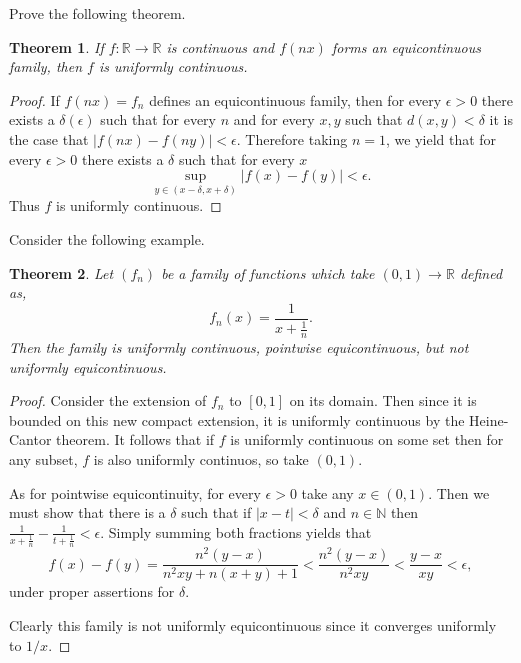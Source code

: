\documentclass[letter]{article}
\newtheorem{theorem}{Theorem}
\newenvironment{menumerate}{%
  \edef\backupindent{\the\parindent}%
  \enumerate%
  \setlength{\parindent}{\backupindent}%
}{\endenumerate}
\begin{document}
\begin{menumerate}
	\item Prove the following theorem.
	\begin{theorem}
	If $f:\mathbb{R} \to \mathbb{R}$ is continuous and $f(nx)$ forms an equicontinuous family, then
	$f$ is uniformly continuous.
	\end{theorem}
	\begin{proof}
		If $f(nx) = f_n$ defines an equicontinuous family, then for every $\epsilon > 0$ there exists
		a $\delta(\epsilon)$ such that for every $n$ and for every $x,y$ such that $d(x,y) < \delta$
		it is the case that $|f(nx) - f(ny)| < \epsilon.$ Therefore taking $n = 1$, we yield that for every
		$\epsilon > 0$ there exists a $\delta$ such that for every $x$
		$$\sup_{y\in{(x-\delta,x+\delta)}}|f(x)-f(y)| < \epsilon.$$
		Thus $f$ is uniformly continuous.
	\end{proof}
	\item Consider the following example.
	\begin{theorem}
		Let $(f_n)$ be a family of functions which take $(0,1) \to \mathbb{R}$ defined as,
		$$f_n(x) = \frac{1}{x+\frac{1}{n}}.$$
		Then the family is uniformly continuous, pointwise equicontinuous, but not uniformly equicontinuous.
	\end{theorem}
	\begin{proof}
		Consider the extension of $f_n$ to $[0,1]$ on its domain. Then since it is bounded on this new compact
		extension, it is uniformly continuous by the Heine-Cantor theorem. It follows that if $f$ is uniformly continuous on some set
		then for any subset, $f$ is also uniformly continuos, so take $(0,1).$ 

		As for pointwise equicontinuity, for every $\epsilon > 0$ take any $x \in (0,1).$ Then we must show that there is a $\delta$ such that
		if $|x -t| < \delta$ and $n \in \mathbb{N}$ then $\frac{1}{x+\frac{1}{n}} - \frac{1}{t+\frac{1}{n}} < \epsilon.$ Simply summing both fractions yields that
		$$f(x)-f(y) = \frac{n^2(y-x)}{n^2xy+n(x+y)+1} < \frac{n^2(y-x)}{n^2xy} < \frac{y-x}{xy} < \epsilon,$$
		under proper assertions for $\delta.$

		Clearly this family is not uniformly equicontinuous since it converges uniformly to $1/x.$

	\end{proof}


\end{menumerate}
\end{document}
